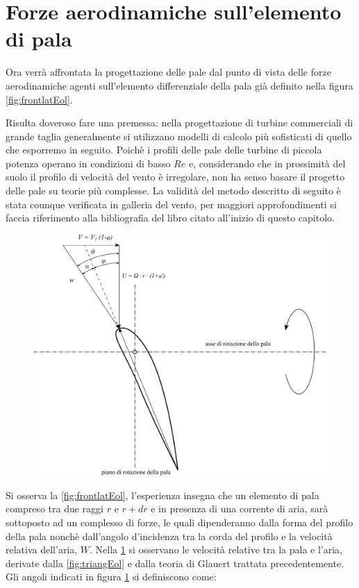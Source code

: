 \section{Forze aerodinamiche sull'elemento di pala}
Ora verrà affrontata la progettazione delle pale dal punto di vista delle forze aerodinamiche agenti sull'elemento differenziale della pala già definito nella figura \ref{fig:frontlatEol}. 

Risulta doveroso fare una premessa: nella progettazione di turbine commerciali di grande taglia generalmente si utilizzano modelli di calcolo più sofisticati di quello che esporremo in seguito. 
Poichè i profili delle pale delle turbine di piccola potenza operano in condizioni di basso $Re$ e, considerando che in prossimità del suolo il profilo di velocità del vento è irregolare, non ha senso basare il progetto delle pale su teorie più complesse. 
La validità del metodo descritto di seguito è stata counque verificata in galleria del vento, per maggiori approfondimenti si faccia riferimento alla bibliografia del libro citato all'inizio di questo capitolo. 
\begin{figure}[h!]
\centering
  \includegraphics[width=.7\textwidth]{fig/triangEol2.pdf}
\caption{}
\label{fig:triangEol2}
\end{figure}
Si osserva la \ref{fig:frontlatEol}, l'esperienza insegna che un elemento di pala compreso tra due raggi $r$ e $r+dr$ e in presenza di una corrente di aria, sarà sottoposto ad un complesso di forze, le quali dipenderanno dalla forma del profilo della pala nonchè dall'angolo d'incidenza tra la corda del profilo e la velocità relativa dell'aria, $W$. 
Nella \ref{fig:triangEol2} si osservano le velocità relative tra la pala e l'aria, derivate dalla \ref{fig:triangEol} e dalla teoria di Glauert trattata precedentemente. 
Gli angoli indicati in figura \ref{fig:triangEol2} si definiscono come:\\
